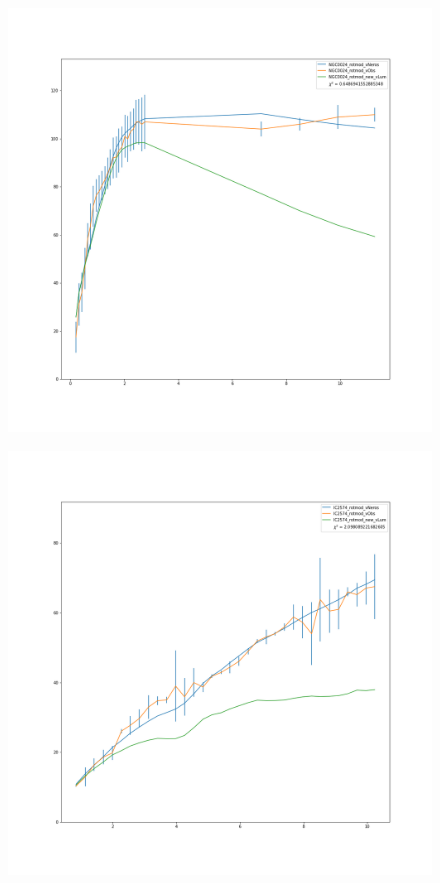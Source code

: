\documentclass[reprint,%
 amsmath,amssymb,
 aps,
]{revtex4-1}
\begin{document}
\begin{figure}
\begin{minipage}{.5\textwidth}
  \includegraphics[width=.95\linewidth]{figures/NGC0024_rotmod_XueSofue.png}
  \label{fig:test2}
\end{minipage}
\begin{minipage}{.5\textwidth}
  \centering
  \includegraphics[width=.95\linewidth]{figures/IC2574_rotmod_XueSofue.png}

\end{minipage}
\end{figure}
\end{document}
